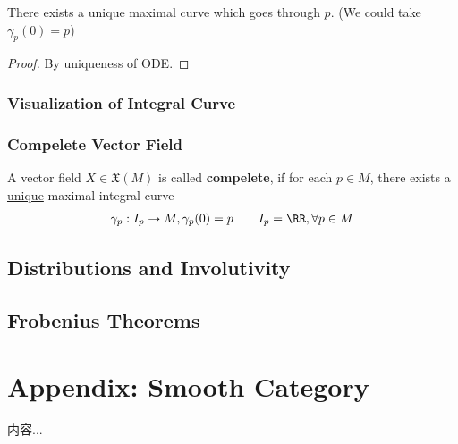 \documentclass[Total.tex]{subfiles}
\begin{document}
				\begin{proposition}
					There exists a unique maximal curve which goes through $p$. (We could take $\gamma_p(0)=p$)
				\end{proposition}
				\begin{proof}
					By uniqueness of ODE. 
				\end{proof}
			\subsection{Visualization of Integral Curve}
			\subsection{Compelete Vector Field}
				\begin{Def}
					A vector field $X\in \mathfrak{X}(M)$ is called \textbf{compelete}, if for each $p\in M$, there exists a \underline{unique} maximal integral curve
					\begin{gather*}
						\gamma_p:I_p\rightarrow M,\gamma_p(0)=p\qquad I_p=\RR,\forall p\in M
					\end{gather*}
				\end{Def}
		\section{Distributions and Involutivity}
		\section{Frobenius Theorems}
		
	\chapter{Appendix: Smooth Category}
		\begin{Def}
			内容...
		\end{Def}
\end{document}
